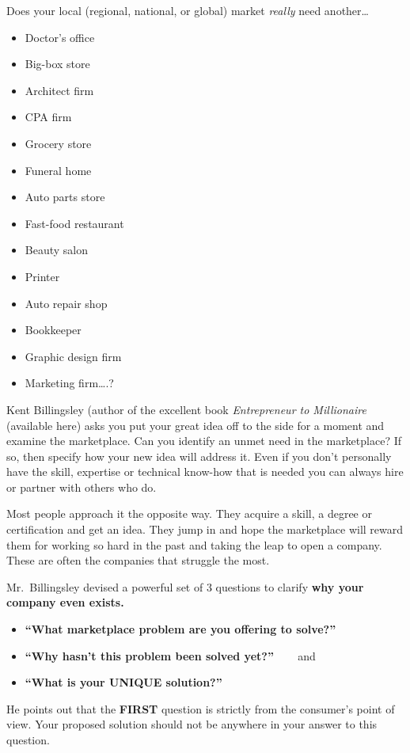 \documentclass[
]{book}
\begin{document}
Does your local (regional, national, or global) market \emph{really} need another\ldots{}

\begin{itemize}
\item
  Doctor's office
\item
  Big-box store
\item
  Architect firm
\item
  CPA firm
\item
  Grocery store
\item
  Funeral home
\item
  Auto parts store
\item
  Fast-food restaurant
\item
  Beauty salon
\item
  Printer
\item
  Auto repair shop
\item
  Bookkeeper
\item
  Graphic design firm
\item
  Marketing firm\ldots.?
\end{itemize}

Kent Billingsley (author of the excellent book \emph{Entrepreneur to Millionaire} (available here) asks you put your great idea off to the side for a moment and examine the marketplace. Can you identify an unmet need in the marketplace? If so, then specify how your new idea will address it. Even if you don't personally have the skill, expertise or technical know-how that is needed you can always hire or partner with others who do.

Most people approach it the opposite way. They acquire a skill, a degree or certification and get an idea. They jump in and hope the marketplace will reward them for working so hard in the past and taking the leap to open a company. These are often the companies that struggle the most.

Mr.~Billingsley devised a powerful set of 3 questions to clarify \textbf{why your company even exists.}

\begin{itemize}
\item
  \textbf{``What marketplace problem are you offering to solve?''}
\item
  \textbf{``Why hasn't this problem been solved yet?''} ~~~ and
\item
  \textbf{``What is your UNIQUE solution?''}
\end{itemize}

He points out that the \textbf{FIRST} question is strictly from the consumer's point of view. Your proposed solution should not be anywhere in your answer to this question.
\end{document}
